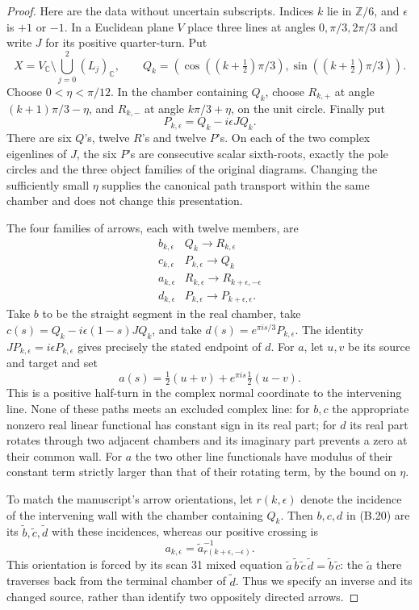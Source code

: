\begin{proof}
Here are the data without uncertain subscripts.  Indices $k$ lie
in $\mathbb Z/6$, and $\epsilon$ is $+1$ or $-1$.  In a Euclidean
plane $V$ place three lines at angles $0,\pi/3,2\pi/3$ and write
$J$ for its positive quarter-turn.  Put
\[
 X=V_{\mathbb C}\setminus\bigcup_{j=0}^2(L_j)_{\mathbb C},
 \qquad Q_k=(\cos((k+\tfrac12)\pi/3),
                   \sin((k+\tfrac12)\pi/3)).
\]
Choose $0<\eta<\pi/12$.  In the chamber containing $Q_k$, choose
$R_{k,+}$ at angle $(k+1)\pi/3-\eta$, and $R_{k,-}$ at angle
$k\pi/3+\eta$, on the unit circle.  Finally put
\[
 P_{k,\epsilon}=Q_k-i\epsilon JQ_k.
\]
There are six $Q$'s, twelve $R$'s and twelve $P$'s.  On each of
the two complex eigenlines of $J$, the six $P$'s are consecutive
scalar sixth-roots, exactly the pole circles and the three object
families of the original diagrams.  Changing the sufficiently
small $\eta$ supplies the canonical path transport within the
same chamber and does not change this presentation.

The four families of arrows, each with twelve members, are
\[
\begin{array}{c|c}
 b_{k,\epsilon}&Q_k\to R_{k,\epsilon}\\
 c_{k,\epsilon}&P_{k,\epsilon}\to Q_k\\
 a_{k,\epsilon}&R_{k,\epsilon}\to R_{k+\epsilon,-\epsilon}\\
 d_{k,\epsilon}&P_{k,\epsilon}\to P_{k+\epsilon,\epsilon}.
\end{array}
\tag{B.20}
\]
Take $b$ to be the straight segment in the real chamber, take
$c(s)=Q_k-i\epsilon(1-s)JQ_k$, and take
$d(s)=e^{\pi i s/3}P_{k,\epsilon}$.  The identity
$J P_{k,\epsilon}=i\epsilon P_{k,\epsilon}$ gives precisely the
stated endpoint of $d$.  For $a$, let $u,v$ be its source and target
and set
\[
 a(s)=\tfrac12(u+v)+e^{\pi i s}\tfrac12(u-v).
\]
This is a positive half-turn in the complex normal coordinate to
the intervening line.  None of these paths meets an excluded
complex line: for $b,c$ the appropriate nonzero real linear
functional has constant sign in its real part; for $d$ its real
part rotates through two adjacent chambers and its imaginary
part prevents a zero at their common wall.  For $a$ the two other
line functionals have modulus of their constant term strictly
larger than that of their rotating term, by the bound on $\eta$.

To match the manuscript's arrow orientations, let
$r(k,\epsilon)$ denote the incidence of the intervening wall with
the chamber containing $Q_k$.  Then $b,c,d$ in (B.20) are its
$\widetilde b,\widetilde c,\widetilde d$ with these incidences,
whereas our positive crossing is
\[
 a_{k,\epsilon}
   =\widetilde a_{r(k+\epsilon,-\epsilon)}^{-1}.
 \tag{B.21}
\]
This orientation is forced by its scan 31 mixed equation
$\widetilde a\,\widetilde b\,\widetilde c\,\widetilde d
 =\widetilde b\,\widetilde c$: the $\widetilde a$ there traverses
back from the terminal chamber of $\widetilde d$.  Thus we specify
an inverse and its changed source, rather than identify two
oppositely directed arrows.


\end{proof}
